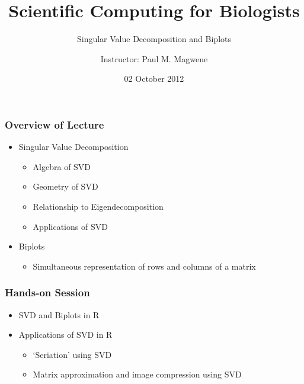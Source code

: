 \documentclass{beamer}
\title{Scientific Computing for Biologists}
\subtitle{Singular Value Decomposition and Biplots}
\author{Instructor: Paul M. Magwene}
\date{02 October 2012}
\begin{document}
\begin{frame}
\titlepage
\end{frame}

\begin{frame}
  \frametitle{Overview of Lecture}
  
\begin{itemize}
		\item Singular Value Decomposition
		\begin{itemize}
			\item Algebra of SVD
			\item Geometry of SVD
			\item Relationship to Eigendecomposition
			\item Applications of SVD			
		\end{itemize}		
		\item Biplots
		\begin{itemize}
			\item Simultaneous representation of rows and columns of a matrix
		\end{itemize}			
\end{itemize}

\end{frame}

\begin{frame}
  \frametitle{Hands-on Session}
\begin{itemize}
    \item SVD and Biplots in R
    \item Applications of SVD in R
    		\begin{itemize}
    		\item `Seriation' using SVD
			  \item Matrix approximation and image compression using SVD
		\end{itemize}
\end{itemize} 


\end{frame}		
\end{document}
